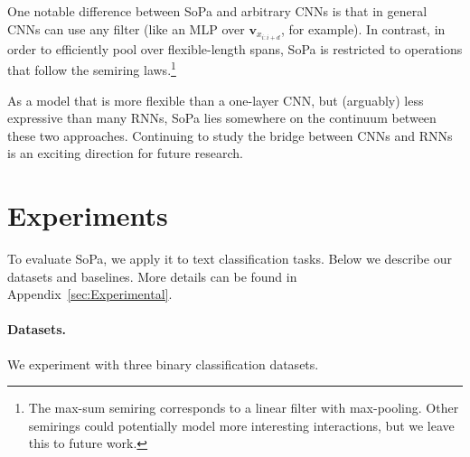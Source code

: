 \documentclass[11pt,a4paper]{article}
\newcommand{\isectionb}[1]{\section{#1}\label{sec:#1}}
\newcommand{\appref}[1]{Appendix~\ref{sec:#1}}
\newcommand{\SoftP}{SoPa\xspace}
\newcommand{\tensor}[1]{\mathbf{#1}}
\begin{document}
One notable difference between \SoftP and arbitrary CNNs is that in general CNNs can use
any filter (like an MLP over $\tensor{v}_{x_{i:i+d}}$, for example).
In contrast, in order to efficiently pool over flexible-length spans, \SoftP is restricted to operations that follow the semiring laws.\footnote{The max-sum semiring corresponds to a linear filter with max-pooling.
Other semirings could potentially model more interesting interactions, but we leave this to future work.}







As a model that is more flexible than a one-layer CNN, but (arguably) less expressive than
many RNNs, \SoftP lies somewhere on the continuum between these two approaches.
Continuing to study the bridge between CNNs and RNNs is an exciting direction for future research.




\isectionb{Experiments}



To evaluate \SoftP, we  apply it to text classification tasks. 
Below we describe our datasets and baselines.
More details can be found in \appref{Experimental}.

\paragraph{Datasets.}
We experiment with three binary classification datasets. 
\end{document}
